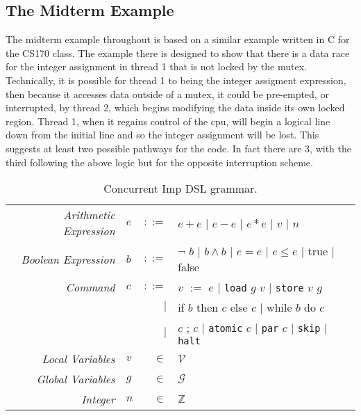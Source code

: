 \subsection{The Midterm Example}
The midterm example throughout is based on a similar example written in C for the CS170 class.  The example there is designed to show that there is a data race for the integer assignment in thread 1 that is not locked by the mutex.  Technically, it is possible for thread 1 to being the integer assigment expression, then because it accesses data outside of a mutex, it could be pre-empted, or interrupted, by thread 2, which begins modifying the data inside its own locked region.  Thread 1, when it regains control of the cpu, will begin a logical line down from the initial line and so the integer assignment will be lost.  This suggests at least two possible pathways for the code.  In fact there are 3, with the third following the above logic but for the opposite interruption scheme.

\begin{table*}[!htbp]
\centering
\begin{tabular}{ r l r l }
\emph{Arithmetic Expression} & $e$ & $::=$ & $e + e$ 
                                         $|$ $e - e$ 
                                         $|$ $e * e$ 
                                         $|$ $v$ 
                                         $|$ $n$ \\
\emph{Boolean Expression} & $b$ & $::=$ & $\neg$ $b$ 
                                      $|$ $b \wedge b$ 
                                      $|$ $e = e$ 
                                      $|$ $e \leq e$ 
                                      $|$ true 
                                      $|$ false \\
\emph{Command} & $c$ & $::=$ & $v$ $:=$ $e$ 
							 $|$   \texttt{load} $g$ $v$
							 $|$   \texttt{store} $v$ $g$ \\ 
               &     &       $|$ & if $b$ then $c$ else $c$
                             $|$   while $b$ do $c$ \\
               &     &       $|$ & $c$ ; $c$
							 $|$   \texttt{atomic} $c$
							 $|$   \texttt{par} $c$
							 $|$   \texttt{skip}
							 $|$   \texttt{halt} 
                               \\
\emph{Local Variables} & $v$ & $\in$ & $\mathcal{V}$ \\
\emph{Global Variables} & $g$ & $\in$ & $\mathcal{G}$ \\
\emph{Integer} & $n$ & $\in$ & $\mathbb{Z}$ \\
\end{tabular}
\caption{
Concurrent Imp DSL grammar. 
}
\label{tab:dsl}
\end{table*}

